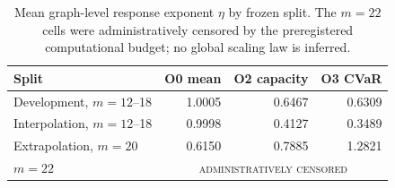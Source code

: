 
\begin{table}[t]
\centering
\caption{Mean graph-level response exponent $\eta$ by frozen split. The $m=22$ cells were administratively censored by the preregistered computational budget; no global scaling law is inferred.}
\label{tab:scaling-summary}
\small
\begin{tabular}{@{}lrrr@{}}
\toprule
Split & O0 mean & O2 capacity & O3 CVaR \\
\midrule
Development, $m=12$--18 & 1.0005 & 0.6467 & 0.6309 \\
Interpolation, $m=12$--18 & 0.9998 & 0.4127 & 0.3489 \\
Extrapolation, $m=20$ & 0.6150 & 0.7885 & 1.2821 \\
$m=22$ & \multicolumn{3}{c}{\textsc{administratively censored}} \\
\bottomrule
\end{tabular}
\end{table}
